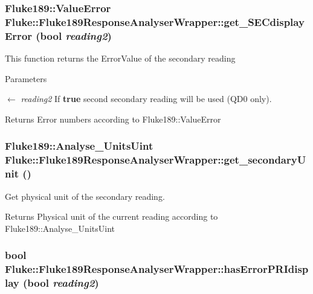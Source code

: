 \hypertarget{classFluke_1_1Fluke189ResponseAnalyserWrapper_ada16572cd1846bdb7d5d863d08e370a5}{
\subsubsection[{get\_\-SECdisplayError}]{\setlength{\rightskip}{0pt plus 5cm}Fluke189::ValueError Fluke::Fluke189ResponseAnalyserWrapper::get\_\-SECdisplayError (bool {\em reading2})}}
\label{classFluke_1_1Fluke189ResponseAnalyserWrapper_ada16572cd1846bdb7d5d863d08e370a5}
This function returns the ErrorValue of the secondary reading 
\begin{DoxyParams}{Parameters}
\item[\mbox{$\leftarrow$} {\em reading2}]If {\bfseries true} second secondary reading will be used (QD0 only). \end{DoxyParams}
\begin{DoxyReturn}{Returns}
Error numbers according to Fluke189::ValueError 
\end{DoxyReturn}
\hypertarget{classFluke_1_1Fluke189ResponseAnalyserWrapper_ab70587acaf503ce077a8dd5a870ca4a6}{
\subsubsection[{get\_\-secondaryUnit}]{\setlength{\rightskip}{0pt plus 5cm}Fluke189::Analyse\_\-UnitsUint Fluke::Fluke189ResponseAnalyserWrapper::get\_\-secondaryUnit ()}}
\label{classFluke_1_1Fluke189ResponseAnalyserWrapper_ab70587acaf503ce077a8dd5a870ca4a6}
Get physical unit of the secondary reading. \begin{DoxyReturn}{Returns}
Physical unit of the current reading according to Fluke189::Analyse\_\-UnitsUint 
\end{DoxyReturn}
\hypertarget{classFluke_1_1Fluke189ResponseAnalyserWrapper_ac1f09299bd05dc25cb95cb7e113ac849}{
\subsubsection[{hasErrorPRIdisplay}]{\setlength{\rightskip}{0pt plus 5cm}bool Fluke::Fluke189ResponseAnalyserWrapper::hasErrorPRIdisplay (bool {\em reading2})}}
